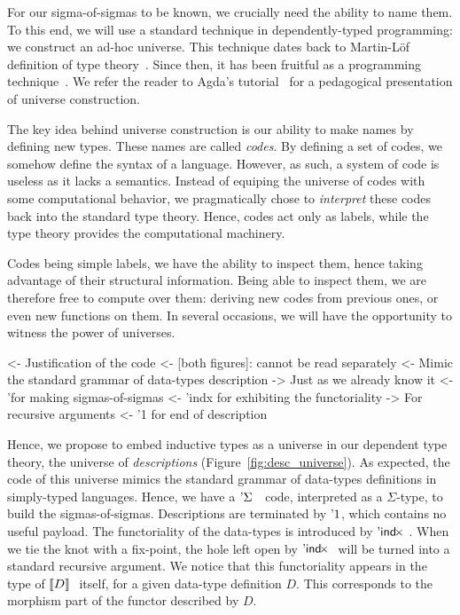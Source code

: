
For our sigma-of-sigmas to be known, we crucially need the ability to
name them. To this end, we will use a standard technique in
dependently-typed programming: we construct an ad-hoc universe. This
technique dates back to Martin-L\"of definition of type
theory~\cite{martin-lof:itt}. Since then, it has been fruitful as a
programming technique~\cite{}. We refer the reader to Agda's
tutorial~\cite{norell:agda-tutorial} for a pedagogical presentation of
universe construction.

The key idea behind universe construction is our ability to make names
by defining new types. These names are called \emph{codes}. By
defining a set of codes, we somehow define the syntax of a
language. However, as such, a system of code is useless as it lacks a
semantics. Instead of equiping the universe of codes with some
computational behavior, we pragmatically chose to \emph{interpret}
these codes back into the standard type theory. Hence, codes act only
as labels, while the type theory provides the computational machinery.

Codes being simple labels, we have the ability to inspect them, hence
taking advantage of their structural information. Being able to
inspect them, we are therefore free to compute over them: deriving new
codes from previous ones, or even new functions on them. In several
occasions, we will have the opportunity to witness the power of
universes.

\begin{wstructure}
<- Justification of the code 
    <- [both figures]: cannot be read separately
    <- Mimic the standard grammar of data-types description
        -> Just as we already know it
        <- '\Sigma for making sigmas-of-sigmas
        <- 'indx for exhibiting the functoriality
            -> For recursive arguments
        <- '1 for end of description
\end{wstructure}

Hence, we propose to embed inductive types as a universe in our
dependent type theory, the universe of \emph{descriptions}
(Figure~\ref{fig:desc_universe}). As expected, the code of this
universe mimics the standard grammar of data-types definitions in
simply-typed languages. Hence, we have a $\DSigma{}{}$ code,
interpreted as a $\Sigma$-type, to build the
sigmas-of-sigmas. Descriptions are terminated by $\DUnit$, which
contains no useful payload. The functoriality of the data-types is
introduced by $\DIndx$. When we tie the knot with a fix-point, the
hole left open by $\DIndx$ will be turned into a standard recursive
argument. We notice that this functoriality appears in the type of
$\descop{D}{}$ itself, for a given data-type definition $D$. This
corresponds to the morphism part of the functor described by $D$.

